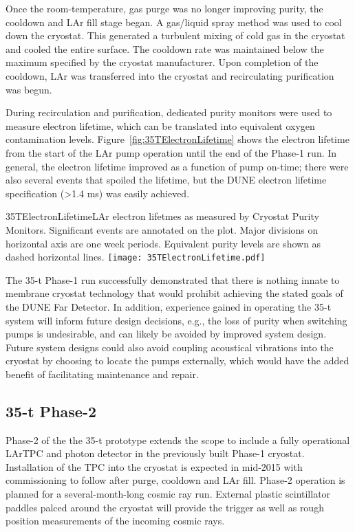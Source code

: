 Once the room-temperature, gas purge was no longer improving purity,
the cooldown and LAr fill stage began.
A gas/liquid spray method was used to cool down the cryostat.
This generated a turbulent mixing of cold gas in the cryostat and cooled the entire surface.
The cooldown rate was maintained below the maximum specified by the cryostat manufacturer.
Upon completion of the cooldown, LAr was transferred into the cryostat and recirculating
purification was begun.

During recirculation and purification, dedicated purity monitors were used to measure electron lifetime, which can
be translated into equivalent oxygen contamination levels.
Figure~\ref{fig:35TElectronLifetime} shows the electron lifetime from the start of the
LAr pump operation until the end of the Phase-1 run.
In general, the electron lifetime improved as a function of pump
on-time; there were also several events that spoiled the lifetime, but the DUNE electron lifetime
specification (>1.4 ms) was easily achieved.

\begin{cdrfigure}{35TElectronLifetime}{LAr electron lifetmes as measured by
Cryostat Purity Monitors. Significant events are annotated on the plot. Major divisions on horizontal axis
are one week periods. Equivalent purity levels are shown as dashed horizontal lines.}
\texttt{[image: 35TElectronLifetime.pdf]}
\end{cdrfigure}

The 35-t Phase-1 run successfully demonstrated that there is nothing innate to
membrane cryostat technology that would prohibit achieving the stated goals of the
DUNE Far Detector. In addition, experience gained in operating the 35-t system
will inform future design decisions, e.g., the loss of purity when switching pumps is
undesirable, and can likely be avoided by improved system design. Future system
designs could also avoid coupling acoustical vibrations into the cryostat by choosing
to locate the pumps externally, which would have the added benefit of facilitating
maintenance and repair.  %

\subsection{35-t Phase-2}
Phase-2 of the the 35-t prototype extends the scope to include a fully operational LArTPC and
photon detector in the previously built Phase-1 cryostat.
Installation of the TPC into the cryostat is expected in mid-2015 with commissioning to follow
after purge, cooldown and LAr fill.  Phase-2 operation is planned for a several-month-long
cosmic ray run.  External plastic scintillator paddles palced around the cryostat will provide
the trigger as well as rough position measurements of the incoming cosmic rays.

